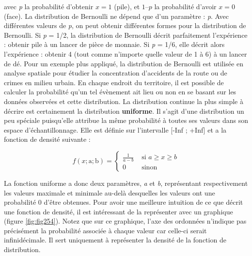 \documentclass[
  11pt,
  french,
]{book}
\begin{document}
avec \emph{p} la probabilité d'obtenir \(x = 1\) (pile), et \(1 – p\) la probabilité d'avoir \(x = 0\) (face). La distribution de Bernoulli ne dépend que d'un paramètre : \emph{p}. Avec différentes valeurs de \emph{p}, on peut obtenir différentes formes pour la distribution de Bernoulli. Si \emph{p} = 1/2, la distribution de Bernoulli décrit parfaitement l'expérience : obtenir pile à un lancer de pièce de monnaie. Si \emph{p} = 1/6, elle décrit alors l'expérience : obtenir 4 (tout comme n'importe quelle valeur de 1 à 6) à un lancer de dé. Pour un exemple plus appliqué, la distribution de Bernoulli est utilisée en analyse spatiale pour étudier la concentration d'accidents de la route ou de crimes en milieu urbain. En chaque endroit du territoire, il est possible de calculer la probabilité qu'un tel évènement ait lieu ou non en se basant sur les données observées et cette distribution.
La distribution continue la plus simple à décrire est certainement la distribution \textbf{uniforme}. Il s'agit d'une distribution un peu spéciale puisqu'elle attribue la même probabilité à toutes ses valeurs dans son espace d'échantillonnage. Elle est définie sur l'intervalle {[}-Inf ; +Inf{]} et a la fonction de densité suivante :

\footnotesize

\begin{equation} f(x ; \mathrm{a} ; \mathrm{b})=\left\{\begin{array}{cc}
\frac{1}{a-b} & \text { si } a \geq x \geq b \\
0 & \text { sinon }
\end{array}\right.
\label{eq:Uniforme}
\end{equation}
\normalsize

La fonction uniforme a donc deux paramètres, \emph{a} et \emph{b}, représentant respectivement les valeurs maximale et minimale au-delà desquelles les valeurs ont une probabilité 0 d'être obtenues. Pour avoir une meilleure intuition de ce que décrit une fonction de densité, il est intéressant de la représenter avec un graphique (figure \ref{fig:fig254}). Notez que sur ce graphique, l'axe des ordonnées n'indique pas précisément la probabilité associée à chaque valeur car celle-ci serait infinidécimale. Il sert uniquement à représenter la densité de la fonction de distribution.
\end{document}
